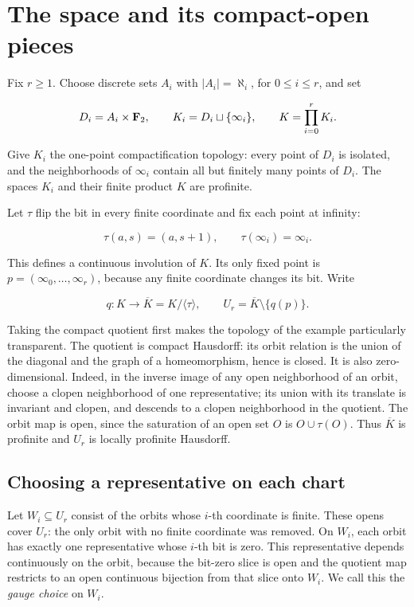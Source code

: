\section{The space and its compact-open pieces}
\label{sec:geometry}

Fix \(r\geq1\). Choose discrete sets \(A_i\) with
\(|A_i|=\aleph_i\), for \(0\leq i\leq r\), and set

\[
D_i=A_i\times\mathbf F_2,
\qquad K_i=D_i\sqcup\{\infty_i\},
\qquad K=\prod_{i=0}^{r}K_i.
\]

Give \(K_i\) the one-point compactification topology: every point of
\(D_i\) is isolated, and the neighborhoods of \(\infty_i\) contain
all but finitely many points of \(D_i\). The spaces \(K_i\) and their
finite product \(K\) are profinite.

Let \(\tau\) flip the bit in every finite coordinate and fix each
point at infinity:

\[
\tau(a,s)=(a,s+1),\qquad \tau(\infty_i)=\infty_i.
\]

This defines a continuous involution of \(K\). Its only fixed point
is \(p=(\infty_0,\ldots,\infty_r)\), because any finite coordinate
changes its bit. Write

\[
q:K\longrightarrow\overline K=K/\langle\tau\rangle,
\qquad U_r=\overline K\setminus\{q(p)\}.
\]

Taking the compact quotient first makes the topology of the example
particularly transparent. The quotient is compact Hausdorff: its orbit
relation is the union of the diagonal and the graph of a homeomorphism,
hence is closed. It is also zero-dimensional. Indeed, in the inverse
image of any open neighborhood of an orbit, choose a clopen neighborhood
of one representative; its union with its translate is invariant and
clopen, and descends to a clopen neighborhood in the quotient. The
orbit map is open, since the saturation of an open set \(O\) is
\(O\cup\tau(O)\). Thus \(\overline K\) is profinite and \(U_r\)
is locally profinite Hausdorff.

\subsection{Choosing a representative on each chart}

Let \(W_i\subseteq U_r\) consist of the orbits whose \(i\)-th
coordinate is finite. These opens cover \(U_r\): the only orbit with
no finite coordinate was removed. On \(W_i\), each orbit has exactly
one representative whose \(i\)-th bit is zero. This representative
depends continuously on the orbit, because the bit-zero slice is open
and the quotient map restricts to an open continuous bijection from
that slice onto \(W_i\). We call this the \emph{gauge choice} on
\(W_i\).

